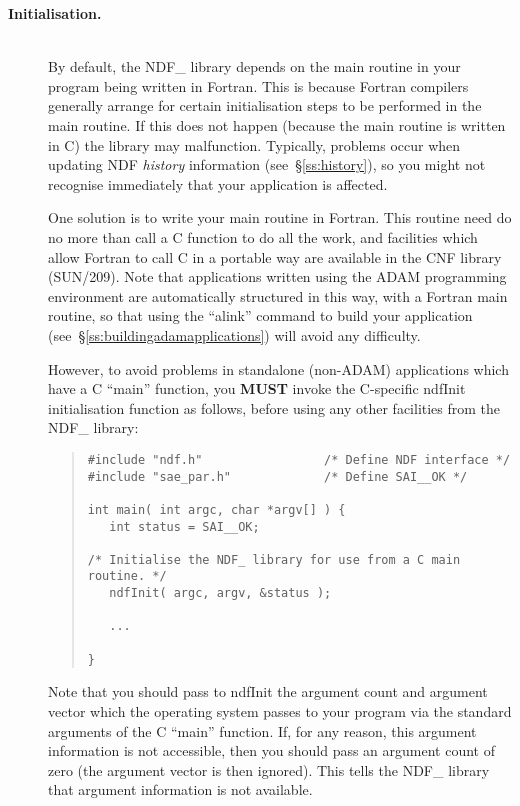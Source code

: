 \documentclass[twoside,11pt]{article}
\newcommand{\xref}[3]{#1}
\newcommand{\st}[1]{{\em{#1}}}
\begin{document}
\begin{description}
\item[{\bf{Initialisation.}}]\mbox{}\\
By default, the NDF\_ library depends on the main routine in your
program being written in Fortran. This is because Fortran compilers
generally arrange for certain initialisation steps to be performed in
the main routine. If this does not happen (because the main routine is
written in C) the library may malfunction. Typically, problems occur
when updating NDF \st{history\/} information (see~\S\ref{ss:history}),
so you might not recognise immediately that your application is
affected.

One solution is to write your main routine in Fortran. This routine
need do no more than call a C function to do all the work, and
facilities which allow Fortran to call C in a portable way are
available in the CNF library (\xref{SUN/209}{sun209}{}). Note that
applications written using the \xref{ADAM}{sun101}{} programming
environment are automatically structured in this way, with a Fortran
main routine, so that using the ``alink'' command to build your
application (see~\S\ref{ss:buildingadamapplications}) will avoid any
difficulty.

However, to avoid problems in standalone (non-ADAM) applications which
have a C ``main'' function, you {\bf{MUST}} invoke the C-specific
ndfInit initialisation function as follows, before using any other
facilities from the NDF\_ library:

\small
\begin{quote}
\begin{verbatim}
#include "ndf.h"                 /* Define NDF interface */
#include "sae_par.h"             /* Define SAI__OK */

int main( int argc, char *argv[] ) {
   int status = SAI__OK;

/* Initialise the NDF_ library for use from a C main routine. */
   ndfInit( argc, argv, &status );

   ...

}
\end{verbatim}
\end{quote}
\normalsize

Note that you should pass to ndfInit the argument count and argument
vector which the operating system passes to your program via the
standard arguments of the C ``main'' function. If, for any reason,
this argument information is not accessible, then you should pass an
argument count of zero (the argument vector is then ignored). This
tells the NDF\_ library that argument information is not available.


\end{description}
\end{document}
